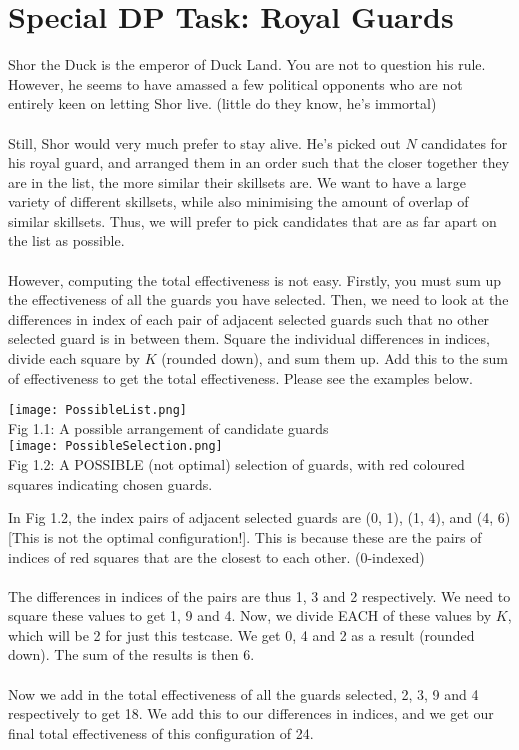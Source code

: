 \documentclass{report}
\begin{document}
\pagebreak
\hfill \break \hfill \break

\section*{Special DP Task: Royal Guards}
Shor the Duck is the emperor of Duck Land. You are not to question his rule. However, he seems to have amassed a few political opponents who are not entirely keen on letting Shor live. (little do they know, he's immortal)
\\\\
Still, Shor would very much prefer to stay alive. He's picked out $N$ candidates for his royal guard, and arranged them in an order such that the closer together they are in the list, the more similar their skillsets are. We want to have a large variety of different skillsets, while also minimising the amount of overlap of similar skillsets. Thus, we will prefer to pick candidates that are as far apart on the list as possible.
\\\\
However, computing the total effectiveness is not easy. Firstly, you must sum up the effectiveness of all the guards you have selected. Then, we need to look at the differences in index of each pair of adjacent selected guards such that no other selected guard is in between them. Square the individual differences in indices, divide each square by $K$ (rounded down), and sum them up. Add this to the sum of effectiveness to get the total effectiveness. Please see the examples below.
    
\begin{center}
    \texttt{[image: PossibleList.png]}
    \\
    Fig 1.1: A possible arrangement of candidate guards\\
    \hfill \break \hfill \break
    \texttt{[image: PossibleSelection.png]}
    \\
    Fig 1.2: A POSSIBLE (not optimal) selection of guards, with red coloured squares indicating chosen guards.
\end{center}

In Fig 1.2, the index pairs of adjacent selected guards are (0, 1), (1, 4), and (4, 6) [This is not the optimal configuration!]. This is because these are the pairs of indices of red squares that are the closest to each other. (0-indexed)
\\\\
The differences in indices of the pairs are thus 1, 3 and 2 respectively. We need to square these values to get 1, 9 and 4. Now, we divide EACH of these values by $K$, which will be 2 for just this testcase. We get 0, 4 and 2 as a result (rounded down). The sum of the results is then 6. 
\\\\
Now we add in the total effectiveness of all the guards selected, 2, 3, 9 and 4 respectively to get 18. We add this to our differences in indices, and we get our final total effectiveness of this configuration of 24.
\\\\
\end{document}
